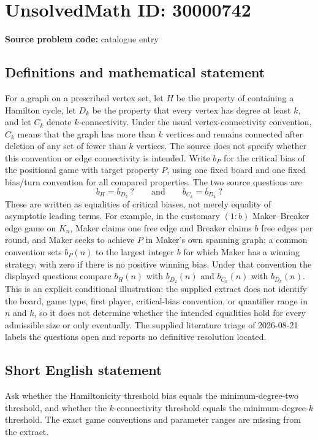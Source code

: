 \documentclass[11pt]{article}
\begin{document}
\section*{UnsolvedMath ID: 30000742}
\textbf{Source problem code:} catalogue entry
\subsection{Definitions and mathematical statement}
For a graph on a prescribed vertex set, let $H$ be the property of containing a Hamilton cycle, let $D_k$ be the property that every vertex has degree at least $k$, and let $C_k$ denote $k$-connectivity. Under the usual vertex-connectivity convention, $C_k$ means that the graph has more than $k$ vertices and remains connected after deletion of any set of fewer than $k$ vertices. The source does not specify whether this convention or edge connectivity is intended. Write $b_P$ for the critical bias of the positional game with target property $P$, using one fixed board and one fixed bias/turn convention for all compared properties. The two source questions are \[b_H=b_{D_2}\ ?\qquad\text{and}\qquad b_{C_k}=b_{D_k}\ ?\] These are written as equalities of critical biases, not merely equality of asymptotic leading terms. For example, in the customary $(1:b)$ Maker--Breaker edge game on $K_n$, Maker claims one free edge and Breaker claims $b$ free edges per round, and Maker seeks to achieve $P$ in Maker's own spanning graph; a common convention sets $b_P(n)$ to the largest integer $b$ for which Maker has a winning strategy, with zero if there is no positive winning bias. Under that convention the displayed questions compare $b_H(n)$ with $b_{D_2}(n)$ and $b_{C_k}(n)$ with $b_{D_k}(n)$. This is an explicit conditional illustration: the supplied extract does not identify the board, game type, first player, critical-bias convention, or quantifier range in $n$ and $k$, so it does not determine whether the intended equalities hold for every admissible size or only eventually. The supplied literature triage of 2026-08-21 labels the questions open and reports no definitive resolution located.
\subsection{Short English statement}
Ask whether the Hamiltonicity threshold bias equals the minimum-degree-two threshold, and whether the $k$-connectivity threshold equals the minimum-degree-$k$ threshold. The exact game conventions and parameter ranges are missing from the extract.
\end{document}
